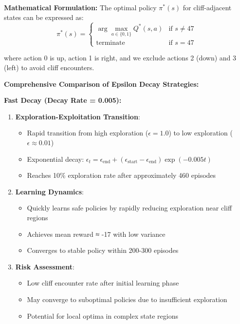 \documentclass[12pt]{article}
\begin{document}
{{{\textbf{Mathematical Formulation:}
The optimal policy $\pi^*(s)$ for cliff-adjacent states can be expressed as:
$$\pi^*(s) = \begin{cases}
\arg\max_{a \in \{0,1\}} Q^*(s,a) & \text{if } s \neq 47 \\
\text{terminate} & \text{if } s = 47
\end{cases}$$

where action 0 is up, action 1 is right, and we exclude actions 2 (down) and 3 (left) to avoid cliff encounters.

\textbf{Comprehensive Comparison of Epsilon Decay Strategies:}

\textbf{Fast Decay (Decay Rate = 0.005):}
\begin{enumerate}
    \item \textbf{Exploration-Exploitation Transition}:
    \begin{itemize}
        \item Rapid transition from high exploration ($\epsilon = 1.0$) to low exploration ($\epsilon \approx 0.01$)
        \item Exponential decay: $\epsilon_t = \epsilon_{\text{end}} + (\epsilon_{\text{start}} - \epsilon_{\text{end}}) \exp(-0.005t)$
        \item Reaches 10\% exploration rate after approximately 460 episodes
    \end{itemize}
    
    \item \textbf{Learning Dynamics}:
    \begin{itemize}
        \item Quickly learns safe policies by rapidly reducing exploration near cliff regions
        \item Achieves mean reward ≈ -17 with low variance
        \item Converges to stable policy within 200-300 episodes
    \end{itemize}
    
    \item \textbf{Risk Assessment}:
    \begin{itemize}
        \item Low cliff encounter rate after initial learning phase
        \item May converge to suboptimal policies due to insufficient exploration
        \item Potential for local optima in complex state regions
    \end{itemize}
\end{enumerate}

}}}
\end{document}
